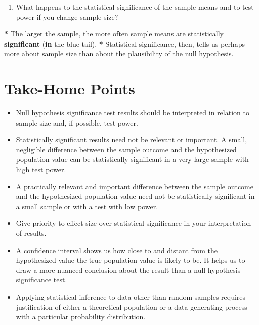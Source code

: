 \documentclass[a4paper]{book}
\newenvironment{Shaded}{\begin{snugshade}}{\end{snugshade}}
\newcommand{\KeywordTok}[1]{\textcolor[rgb]{0,0,0}{\textbf{#1}}}
\newcommand{\StringTok}[1]{\textcolor[rgb]{0.00,0.00,0.00}{#1}}
\newcommand{\ControlFlowTok}[1]{\textcolor[rgb]{0.00,0.00,0.00}{\textbf{#1}}}
\newcommand{\OperatorTok}[1]{\textcolor[rgb]{0.00,0.00,0.00}{\textbf{#1}}}
\newcommand{\NormalTok}[1]{#1}
\providecommand{\tightlist}{%
  \setlength{\itemsep}{0pt}\setlength{\parskip}{0pt}}
\theoremstyle{definition}
\theoremstyle{definition}
\theoremstyle{definition}
\theoremstyle{remark}
\begin{document}
\begin{enumerate}
\def\labelenumi{\arabic{enumi}.}
\setcounter{enumi}{2}
\tightlist
\item
  What happens to the statistical significance of the sample means and
  to test power if you change sample size?
\end{enumerate}

\begin{Shaded}
\begin{Highlighting}[]
\OperatorTok{*}\StringTok{ }\NormalTok{The larger the sample, the more often sample means are statistically}
\KeywordTok{significant}\NormalTok{ (}\ControlFlowTok{in}\NormalTok{ the blue tail).}
\OperatorTok{*}\StringTok{ }\NormalTok{Statistical significance, then, tells us perhaps more about sample size than}
\NormalTok{about the plausibility of the null hypothesis.}
\end{Highlighting}
\end{Shaded}

\section{Take-Home Points}\label{take-home-points-5}

\begin{itemize}
\item
  Null hypothesis significance test results should be interpreted in
  relation to sample size and, if possible, test power.
\item
  Statistically significant results need not be relevant or important. A
  small, negligible difference between the sample outcome and the
  hypothesized population value can be statistically significant in a
  very large sample with high test power.
\item
  A practically relevant and important difference between the sample
  outcome and the hypothesized population value need not be
  statistically significant in a small sample or with a test with low
  power.
\item
  Give priority to effect size over statistical significance in your
  interpretation of results.
\item
  A confidence interval shows us how close to and distant from the
  hypothesized value the true population value is likely to be. It helps
  us to draw a more nuanced conclusion about the result than a null
  hypothesis significance test.
\item
  Applying statistical inference to data other than random samples
  requires justification of either a theoretical population or a data
  generating process with a particular probability distribution.
\end{itemize}
\end{document}

